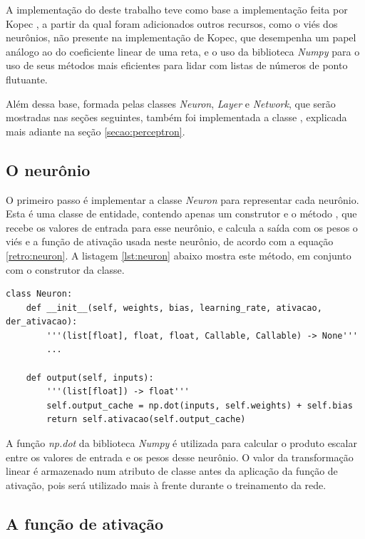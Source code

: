 A implementação do  deste trabalho teve como base a implementação feita por Kopec \citep{classic}, a partir da qual foram adicionados outros recursos, como o viés dos neurônios, não presente na implementação de Kopec, que desempenha um papel análogo ao do coeficiente linear de uma reta, e o uso da biblioteca \emph{Numpy} para o uso de seus métodos mais eficientes para lidar com listas de números de ponto flutuante. 

Além dessa base, formada pelas classes \emph{Neuron}, \emph{Layer} e \emph{Network}, que serão mostradas nas seções seguintes, também foi implementada a classe , explicada mais adiante na seção \ref{secao:perceptron}.

\subsection{O neurônio}

O primeiro passo é implementar a classe \emph{Neuron} para representar cada neurônio. Esta é uma classe de entidade, contendo apenas um construtor e o método , que recebe os valores de entrada para esse neurônio, e calcula a saída com os pesos o viés e a função de ativação usada neste neurônio, de acordo com a equação \ref{retro:neuron}. A listagem \ref{lst:neuron} abaixo mostra este método, em conjunto com o construtor da classe.

\newpage

\estiloR
\begin{lstlisting}[caption={Trecho da classe Neuron}, label={lst:neuron}, escapeinside={\%}]
class Neuron:
    def __init__(self, weights, bias, learning_rate, ativacao, der_ativacao):
        '''(list[float], float, float, Callable, Callable) -> None'''
        ...

    def output(self, inputs):
        '''(list[float]) -> float'''
        self.output_cache = np.dot(inputs, self.weights) + self.bias
        return self.ativacao(self.output_cache)
\end{lstlisting}


A função \emph{np.dot} da biblioteca \emph{Numpy} é utilizada para calcular o produto escalar entre os valores de entrada e os pesos desse neurônio. O valor da transformação linear é armazenado num atributo de classe antes da aplicação da função de ativação, pois será utilizado mais à frente durante o treinamento da rede.

\subsection{A função de ativação}

